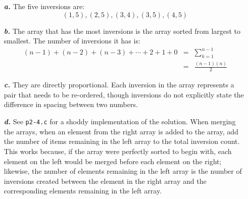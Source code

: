 \noindent\begin{enumerate}
	\item[\textbf{\textit{a.}}]
		The five inversions are:
		\begin{equation*}
			(1,5), (2,5), (3,4), (3,5), (4,5)
		\end{equation*}

	\item[\textbf{\textit{b.}}]
		The array that has the most inversions is the array sorted from largest to smallest. The number of inversions it has is:
		\begin{eqnarray*}
			(n-1) + (n-2) + (n-3) + \cdots + 2 + 1 + 0 & = & \sum_{k=1}^{n-1} \\
			& = & \frac{(n-1)(n)}{2}
		\end{eqnarray*}

	\item[\textbf{\textit{c.}}]
		They are directly proportional. Each inversion in the array represents a pair that needs to be re-ordered, though inversions do not explicitly state the difference in spacing between two numbers.

	\item[\textbf{\textit{d.}}] 
		See \texttt{p2-4.c} for a shoddy implementation of the solution. When merging the arrays, when an element from the right array is added to the array, add the number of items remaining in the left array to the total inversion count. This works because, if the array were perfectly sorted to begin with, each element on the left would be merged before each element on the right; likewise, the number of elements remaining in the left array is the number of inversions created between the element in the right array and the corresponding elements remaining in the left array.
\end{enumerate}
